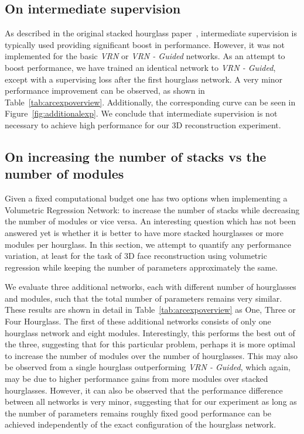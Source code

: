 \subsection{On intermediate supervision}
\label{sec:arc_intersup}

As described in the original stacked hourglass
paper~\cite{newell2016stacked}, intermediate supervision is typically
used providing significant boost in performance. However, it was not
implemented for the basic \textit{VRN} or \textit{VRN - Guided}
networks. As an attempt to boost performance, we have trained an
identical network to \textit{VRN - Guided}, except with a supervising
loss after the first hourglass network. A very minor performance
improvement can be observed, as shown in
Table~\ref{tab:arcexpoverview}. Additionally, the corresponding curve
can be seen in Figure~\ref{fig:additionalexp}. We conclude that
intermediate supervision is not necessary to achieve high performance
for our 3D reconstruction experiment.



\subsection{On increasing the number of stacks vs the number of modules}
\label{sec:arc_secvsmod}

Given a fixed computational budget one has two options when
implementing a Volumetric Regression Network: to increase the number
of stacks while decreasing the number of modules or vice versa.  An
interesting question which has not been answered yet is whether it is
better to have more stacked hourglasses or more modules per
hourglass. In this section, we attempt to quantify any performance
variation, at least for the task of 3D face reconstruction using
volumetric regression while keeping the number of parameters
approximately the same.

We evaluate three additional networks, each with different number of
hourglasses and modules, such that the total number of parameters
remains very similar. These results are shown in detail in
Table~\ref{tab:arcexpoverview} as One, Three or Four Hourglass. The
first of these additional networks consists of only one hourglass
network and eight modules. Interestingly, this performs the best out
of the three, suggesting that for this particular problem, perhaps it
is more optimal to increase the number of modules over the number of
hourglasses. This may also be observed from a single hourglass
outperforming \textit{VRN - Guided}, which again, may be due to higher
performance gains from more modules over stacked hourglasses. However,
it can also be observed that the performance difference between all
networks is very minor, suggesting that for our experiment as long as
the number of parameters remains roughly fixed good performance can be
achieved independently of the exact configuration of the hourglass
network.


